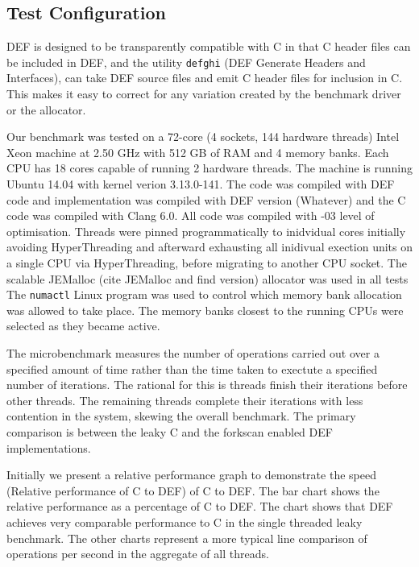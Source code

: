 \subsection{Test Configuration}

DEF is designed to be transparently compatible with C in that C header files can be included in DEF, and the utility \texttt{defghi} (DEF Generate Headers and Interfaces), can take DEF source files and emit C header files for inclusion in C.  This makes it easy to correct for any variation created by the benchmark driver or the allocator.

Our benchmark was tested on a 72-core (4 sockets, 144 hardware threads) Intel Xeon machine at 2.50 GHz with 512 GB of RAM and 4 memory banks. Each CPU has 18 cores capable of running 2 hardware threads. The machine is running Ubuntu 14.04 with kernel verion 3.13.0-141. The code was compiled with DEF code and implementation was compiled with DEF version (Whatever) and the C code was compiled with Clang 6.0. All code was compiled with -03 level of optimisation. %
Threads were pinned programmatically to inidvidual cores initially avoiding HyperThreading and afterward exhausting all inidivual exection units on a single CPU via HyperThreading, before migrating to another CPU socket. The scalable JEMalloc (cite JEMalloc and find version) allocator was used in all tests  The \texttt{numactl} Linux program was used to control which memory bank allocation was allowed to take place. The memory banks closest to the running CPUs were selected as they became active.

The microbenchmark measures the number of operations carried out over a specified amount of time rather than the time taken to exectute a specified number of iterations. The rational for this is threads finish their iterations before other threads. The remaining threads complete their iterations with less contention in the system, skewing the overall benchmark. The primary comparison is between the leaky C and the forkscan enabled DEF implementations. 

Initially we present a relative performance graph to demonstrate the speed (Relative performance of C to DEF) of C to DEF. The bar chart shows the relative performance as a percentage of C to DEF. The chart shows that DEF achieves very comparable performance to C in the single threaded leaky benchmark. The other charts represent a more typical line comparison of operations per second in the aggregate of all threads.


